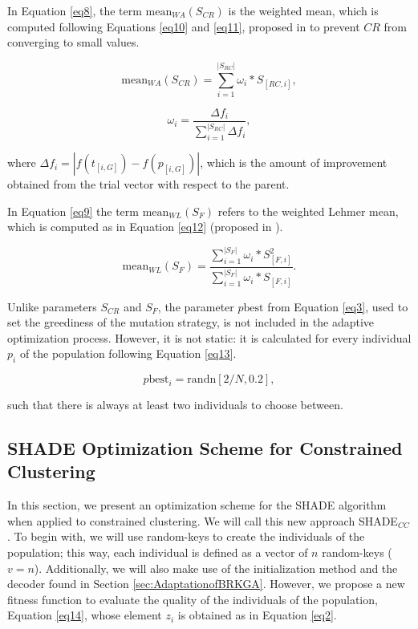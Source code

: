 In Equation \ref{eq8}, the term $\text{mean}_{WA} (S_{CR})$ is the weighted mean, which is computed following Equations \eqref{eq10} and \eqref{eq11}, proposed in \cite{peng2009multi} to prevent $CR$ from converging to small values.

\begin{equation}
\text{mean}_{WA} (S_{CR}) = \sum_{i = 1}^{|S_{RC}|} \omega_i * S_{[RC,i]},
\label{eq10}
\end{equation}

\begin{equation}
\omega_i = \frac{\Delta f_i}{\sum_{i = 1}^{|S_{RC}|} \Delta f_i},
\label{eq11}
\end{equation}

\noindent where $\Delta f_i = |f(t_{[i,G]}) - f(p_{[i, G]})|$, which is the amount of improvement obtained from the trial vector with respect to the parent.

In Equation \ref{eq9} the term $\text{mean}_{WL} (S_{F})$ refers to the weighted Lehmer mean, which is computed as in Equation \eqref{eq12} (proposed in \cite{tanabe2013success}).

\begin{equation}
\text{mean}_{WL} (S_{F}) = \frac{\sum_{i = 1}^{|S_{F}|} \omega_i * S^2_{[F,i]}}{\sum_{i = 1}^{|S_{F}|} \omega_i * S_{[F,i]}}.
\label{eq12}
\end{equation}

Unlike parameters $S_{CR}$ and $S_F$, the parameter $p\text{best}$ from Equation \eqref{eq3}, used to set the greediness of the mutation strategy, is not included in the adaptive optimization process. However, it is not static: it is calculated for every individual $p_i$ of the population following Equation \eqref{eq13}.

\begin{equation}
p\text{best}_i = \text{randn}[2/N, 0.2],
\label{eq13}
\end{equation}

\noindent such that there is always at least two individuals to choose between.

\subsection[\acsfont{SHADE} Optimization Scheme for Constrained Clustering]{SHADE Optimization Scheme for Constrained Clustering} \label{sec:SHADEadapt}

In this section, we present an optimization scheme for the \acs{SHADE} algorithm when applied to constrained clustering. We will call this new approach \acs{SHADE}$_{CC}$. To begin with, we will use random-keys to create the individuals of the population; this way, each individual is defined as a vector of $n$ random-keys ($v = n$). Additionally, we will also make use of the initialization method and the decoder found in Section \ref{sec:AdaptationofBRKGA}. However, we propose a new fitness function to evaluate the quality of the individuals of the population, Equation \eqref{eq14}, whose element $z_i$ is obtained as in Equation \eqref{eq2}.

